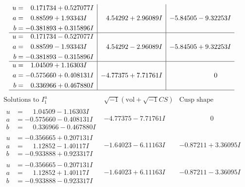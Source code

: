 \documentclass[1p]{elsarticle_modified}
\theoremstyle{definition}
\newcommand{\I}{\sqrt{-1}}
\begin{document}
$$\begin{array}{c|c|c}
\begin{aligned}
u &= \phantom{-}0.171734 + 0.527077 I \\
a &= \phantom{-}0.88599 + 1.93343 I \\
b &= -0.381893 + 0.315896 I\end{aligned}
 & \phantom{-}4.54292 + 2.96089 I & -5.84505 - 9.32253 I \\ \hline\begin{aligned}
u &= \phantom{-}0.171734 - 0.527077 I \\
a &= \phantom{-}0.88599 - 1.93343 I \\
b &= -0.381893 - 0.315896 I\end{aligned}
 & \phantom{-}4.54292 - 2.96089 I & -5.84505 + 9.32253 I \\ \hline\begin{aligned}
u &= \phantom{-}1.04509 + 1.16303 I \\
a &= -0.575660 + 0.408131 I \\
b &= \phantom{-}0.336966 + 0.467880 I\end{aligned}
 & -4.77375 + 7.71761 I & \phantom{-0.000000 } 0\\
 \hline 
 \end{array}$$\newpage$$\begin{array}{c|c|c}  
\text{Solutions to }I^u_{1}& \I (\text{vol} + \sqrt{-1}CS) & \text{Cusp shape}\\
 \hline 
\begin{aligned}
u &= \phantom{-}1.04509 - 1.16303 I \\
a &= -0.575660 - 0.408131 I \\
b &= \phantom{-}0.336966 - 0.467880 I\end{aligned}
 & -4.77375 - 7.71761 I & \phantom{-0.000000 } 0 \\ \hline\begin{aligned}
u &= -0.356665 + 0.207131 I \\
a &= \phantom{-}1.12852 - 1.40117 I \\
b &= -0.933888 + 0.923317 I\end{aligned}
 & -1.64023 - 6.11163 I & -0.87211 + 3.36095 I \\ \hline\begin{aligned}
u &= -0.356665 - 0.207131 I \\
a &= \phantom{-}1.12852 + 1.40117 I \\
b &= -0.933888 - 0.923317 I\end{aligned}
 & -1.64023 + 6.11163 I & -0.87211 - 3.36095 I \\ \hline\begin{aligned}

\end{aligned}
\end{array}$$
\end{document}
